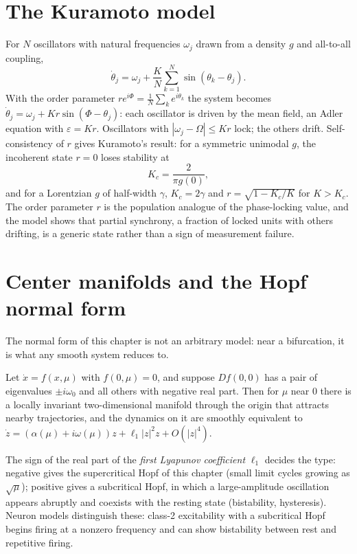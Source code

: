 \section{The Kuramoto model}
For $N$ oscillators with natural frequencies $\omega_j$ drawn from a
density $g$ and all-to-all coupling,
\[
\dot\theta_j=\omega_j+\frac KN\sum_{k=1}^N\sin(\theta_k-\theta_j).
\]
With the order parameter $re^{i\Phi}=\frac1N\sum_ke^{i\theta_k}$ the
system becomes $\dot\theta_j=\omega_j+Kr\sin(\Phi-\theta_j)$: each
oscillator is driven by the mean field, an Adler equation with
$\varepsilon=Kr$. Oscillators with $|\omega_j-\Omega|\le Kr$ lock;
the others drift. Self-consistency of $r$ gives Kuramoto's result: for a
symmetric unimodal $g$, the incoherent state $r=0$ loses stability at
\[
K_c=\frac{2}{\pi g(0)},
\]
and for a Lorentzian $g$ of half-width $\gamma$, $K_c=2\gamma$ and
$r=\sqrt{1-K_c/K}$ for $K>K_c$. The order parameter $r$ is the
population analogue of the phase-locking value, and the model shows that
partial synchrony, a fraction of locked units with others drifting, is a
generic state rather than a sign of measurement failure.

\section{Center manifolds and the Hopf normal form}
The normal form of this chapter is not an arbitrary model: near a
bifurcation, it is what any smooth system reduces to.
\begin{theorem}
Let $\dot x=f(x,\mu)$ with $f(0,\mu)=0$, and suppose $Df(0,0)$ has a pair
of eigenvalues $\pm i\omega_0$ and all others with negative real part.
Then for $\mu$ near $0$ there is a locally invariant two-dimensional
manifold through the origin that attracts nearby trajectories, and the
dynamics on it are smoothly equivalent to
$\dot z=(\alpha(\mu)+i\omega(\mu))z+\ell_1|z|^2z+O(|z|^4)$.
\end{theorem}
The sign of the real part of the \emph{first Lyapunov coefficient}
$\ell_1$ decides the type: negative gives the supercritical Hopf of
this chapter (small limit cycles growing as $\sqrt\mu$); positive gives
a subcritical Hopf, in which a large-amplitude oscillation appears
abruptly and coexists with the resting state (bistability, hysteresis).
Neuron models distinguish these: class-2 excitability with a
subcritical Hopf begins firing at a nonzero frequency and can show
bistability between rest and repetitive firing.

